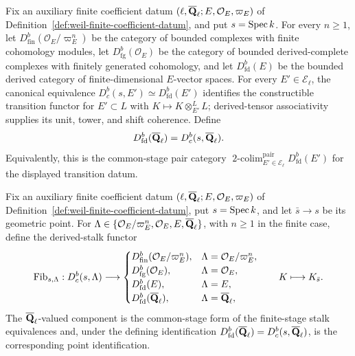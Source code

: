 \begin{definition}
\label{def:point-coefficient-categories}


Fix an auxiliary finite coefficient datum
\((\ell,\overline{\mathbf Q}_\ell;E,\mathcal O_E,\varpi_E)\) of
Definition~\ref{def:weil-finite-coefficient-datum}, and put \(s=\operatorname{Spec} k\).
For every \(n\geq1\), let
\(D^b_{\mathrm{fin}}(\mathcal O_E/\varpi_E^n)\) be the category of
bounded complexes with finite cohomology modules, let
\(D^b_{\mathrm{fg}}(\mathcal O_E)\) be the category of bounded
derived-complete complexes with finitely generated cohomology, and let
\(D^b_{\mathrm{fd}}(E)\) be the bounded derived category of
finite-dimensional \(E\)-vector spaces.  For every
\(E'\in\mathcal E_\ell\), the canonical equivalence
\(D^b_c(s,E')\simeq D^b_{\mathrm{fd}}(E')\) identifies the constructible
transition functor for \(E'\subset L\) with
\(K\mapsto K\otimes^L_{E'}L\); derived-tensor associativity supplies its
unit, tower, and shift coherence.  Define
\[
 D^b_{\mathrm{fd}}(\overline{\mathbf Q}_\ell)=
 D^b_c(s,\overline{\mathbf Q}_\ell).
\]
Equivalently, this is the common-stage pair category
\(\operatorname{2-colim}^{\mathrm{pair}}_{E'\in\mathcal E_\ell}
D^b_{\mathrm{fd}}(E')\) for the displayed transition datum.
\end{definition}


\begin{definition}
\label{def:point-fiber-functor}


Fix an auxiliary finite coefficient datum
\((\ell,\overline{\mathbf Q}_\ell;E,\mathcal O_E,\varpi_E)\) of
Definition~\ref{def:weil-finite-coefficient-datum}, put
\(s=\operatorname{Spec} k\), and let \(\bar s\to s\) be its geometric point.  For
\(\Lambda\in\{\mathcal O_E/\varpi_E^n,\mathcal O_E,E,\overline{\mathbf Q}_\ell\}\), with
\(n\geq1\) in the finite case, define the derived-stalk functor
\[
 \operatorname{Fib}_{s,\Lambda}:D^b_c(s,\Lambda)\longrightarrow
 \begin{cases}
 D^b_{\mathrm{fin}}(\mathcal O_E/\varpi_E^n),
   &\Lambda=\mathcal O_E/\varpi_E^n,\\
 D^b_{\mathrm{fg}}(\mathcal O_E),&\Lambda=\mathcal O_E,\\
 D^b_{\mathrm{fd}}(E),&\Lambda=E,\\
 D^b_{\mathrm{fd}}(\overline{\mathbf Q}_\ell),&\Lambda=\overline{\mathbf Q}_\ell,
 \end{cases}
 \qquad K\longmapsto K_{\bar s}.
\]
The \(\overline{\mathbf Q}_\ell\)-valued component is the common-stage form of the finite-stage
stalk equivalences and, under the defining identification
\(D^b_{\mathrm{fd}}(\overline{\mathbf Q}_\ell)=D^b_c(s,\overline{\mathbf Q}_\ell)\), is the corresponding point
identification.
\end{definition}

